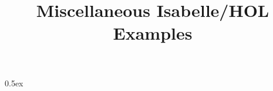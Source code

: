\documentclass[11pt,a4paper]{article}
\begin{document}
\title{Miscellaneous Isabelle/HOL Examples}
\maketitle

\tableofcontents

\parindent 0pt\parskip 0.5ex

\end{document}
